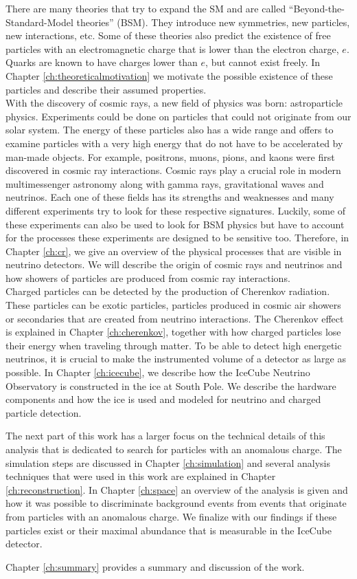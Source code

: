 \noindent There are many theories that try to expand the SM and are called ``Beyond-the-Standard-Model theories'' (BSM). They introduce new symmetries, new particles, new interactions, etc. Some of these theories also predict the existence of free particles with an electromagnetic charge that is lower than the electron charge, $e$. Quarks are known to have charges lower than $e$, but cannot exist freely. In Chapter \ref{ch:theoreticalmotivation} we motivate the possible existence of these particles and describe their assumed properties.\\

\noindent With the discovery of cosmic rays, a new field of physics was born: astroparticle physics. Experiments could be done on particles that could not originate from our solar system. The energy of these particles also has a wide range and offers to examine particles with a very high energy that do not have to be accelerated by man-made objects. For example, positrons, muons, pions, and kaons were first discovered in cosmic ray interactions. Cosmic rays play a crucial role in modern multimessenger astronomy along with gamma rays, gravitational waves and neutrinos. Each one of these fields has its strengths and weaknesses and many different experiments try to look for these respective signatures. Luckily, some of these experiments can also be used to look for BSM physics but have to account for the processes these experiments are designed to be sensitive too. Therefore, in Chapter \ref{ch:cr}, we give an overview of the physical processes that are visible in neutrino detectors. We will describe the origin of cosmic rays and neutrinos and how showers of particles are produced from cosmic ray interactions.\\

\noindent Charged particles can be detected by the production of Cherenkov radiation. These particles can be exotic particles, particles produced in cosmic air showers or secondaries that are created from neutrino interactions. The Cherenkov effect is explained in Chapter \ref{ch:cherenkov}, together with how charged particles lose their energy when traveling through matter.
To be able to detect high energetic neutrinos, it is crucial to make the instrumented volume of a detector as large as possible. In Chapter \ref{ch:icecube}, we describe how the IceCube Neutrino Observatory is constructed in the ice at South Pole. We describe the hardware components and how the ice is used and modeled for neutrino and charged particle detection.

The next part of this work has a larger focus on the technical details of this analysis that is dedicated to search for particles with an anomalous charge. The simulation steps are discussed in Chapter \ref{ch:simulation} and several analysis techniques that were used in this work are explained in Chapter \ref{ch:reconstruction}. In Chapter \ref{ch:space} an overview of the analysis is given and how it was possible to discriminate background events from events that originate from particles with an anomalous charge. We finalize with our findings if these particles exist or their maximal abundance that is measurable in the IceCube detector.

Chapter \ref{ch:summary} provides a summary and discussion of the work.